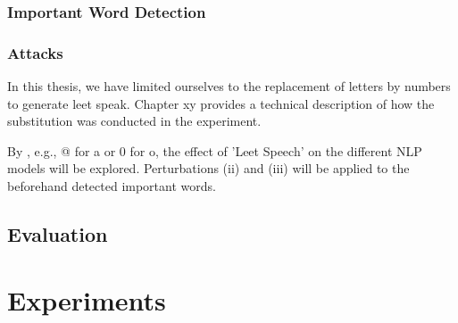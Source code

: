 
\subsubsection{Important Word Detection} 


\subsubsection{Attacks}

In this thesis, we have limited ourselves to the replacement of letters by numbers to generate leet speak. Chapter xy provides a technical description of how the substitution was conducted in the experiment.

By , e.g., @ for a or 0 for o, the effect of 'Leet Speech' on the different NLP models will be explored.
Perturbations (ii) and (iii) will be applied to the beforehand detected important words.


\subsection{Evaluation} 




\section{Experiments}


